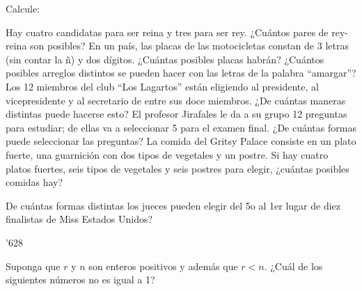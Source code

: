 \documentclass[10pt,addpoints]{exam}
\begin{document}
\begin{questions}
\question Calcule:
\begin{parts}
\end{parts}
\vspace*{.5in}
\question Hay cuatro candidatas para ser reina y tres para ser rey. ¿Cuántos pares de rey-reina son posibles?\vspace*{.5in}
\question En un país, las placas de las motocicletas constan de 3 letras (sin contar la ñ) y dos dígitos. ¿Cuántas posibles placas habrán?\vspace*{.5in}
\question ¿Cuántos posibles arreglos distintos se pueden hacer con las letras de la palabra ``amargar''?\vspace*{.5in}
\question Los 12 miembros del club ``Los Lagartos'' están eligiendo al presidente, al vicepresidente y al secretario de entre sus doce miembros. ¿De cuántas maneras distintas puede hacerse esto?\vspace*{.5in}
\question El profesor Jirafales le da a su grupo 12 preguntas para estudiar; de ellas va a seleccionar 5 para el examen final. ¿De cuántas formas puede seleccionar las preguntas?\vspace*{.5in}
\question La comida del Gritsy Palace consiste en un plato fuerte, una guarnición con dos tipos de vegetales y un postre. Si hay cuatro platos fuertes, seis tipos de vegetales y seis postres para elegir, ¿cuántas posibles comidas hay?

\begin{oneparchoices}
\end{oneparchoices}
\question De cuántas formas distintas los jueces pueden elegir del 5o al 1er lugar de diez finalistas de Miss Estados Unidos?

\begin{oneparchoices}
'628
\end{oneparchoices}
\question Suponga que $r$ y $n$ son enteros positivos y además que $r< n$. ¿Cuál de los siguientes números no es igual a 1?


\end{questions}
\end{document}
